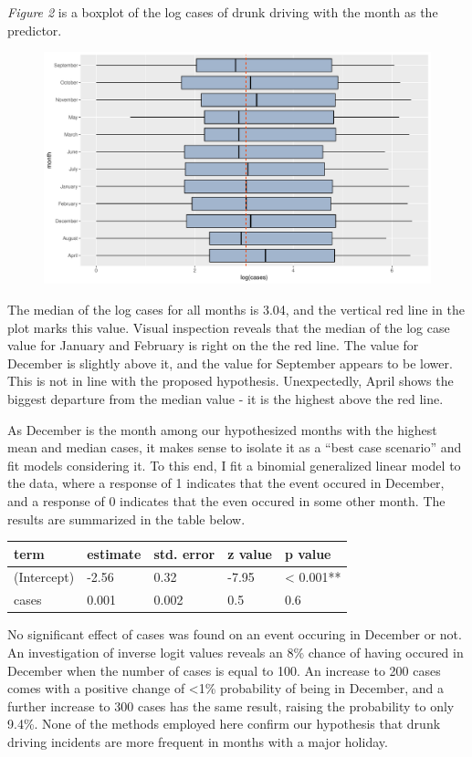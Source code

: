 \documentclass[floatsintext,man]{apa6}
\theoremstyle{definition}
\theoremstyle{definition}
\theoremstyle{definition}
\theoremstyle{remark}
\begin{document}
\emph{Figure 2} is a boxplot of the log cases of drunk driving with the
month as the predictor.

\begin{figure}
\centering
\includegraphics{final_files/figure-latex/bymonth-1.pdf}
\caption{}
\end{figure}

The median of the log cases for all months is 3.04, and the vertical red
line in the plot marks this value. Visual inspection reveals that the
median of the log case value for January and February is right on the
the red line. The value for December is slightly above it, and the value
for September appears to be lower. This is not in line with the proposed
hypothesis. Unexpectedly, April shows the biggest departure from the
median value - it is the highest above the red line.

As December is the month among our hypothesized months with the highest
mean and median cases, it makes sense to isolate it as a \enquote{best
case scenario} and fit models considering it. To this end, I fit a
binomial generalized linear model to the data, where a response of 1
indicates that the event occured in December, and a response of 0
indicates that the even occured in some other month. The results are
summarized in the table below.

\begin{longtable}[]{@{}lllll@{}}
\toprule
term & estimate & std. error & z value & p value\tabularnewline
\midrule
\endhead
(Intercept) & -2.56 & 0.32 & -7.95 & \textless{} 0.001**\tabularnewline
cases & 0.001 & 0.002 & 0.5 & 0.6\tabularnewline
\bottomrule
\end{longtable}

No significant effect of cases was found on an event occuring in
December or not. An investigation of inverse logit values reveals an 8\%
chance of having occured in December when the number of cases is equal
to 100. An increase to 200 cases comes with a positive change of
\textless{}1\% probability of being in December, and a further increase
to 300 cases has the same result, raising the probability to only 9.4\%.
None of the methods employed here confirm our hypothesis that drunk
driving incidents are more frequent in months with a major holiday.
\end{document}
